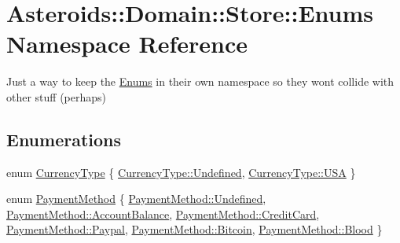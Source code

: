 \hypertarget{namespaceAsteroids_1_1Domain_1_1Store_1_1Enums}{}\section{Asteroids\+:\+:Domain\+:\+:Store\+:\+:Enums Namespace Reference}
\label{namespaceAsteroids_1_1Domain_1_1Store_1_1Enums}


Just a way to keep the \hyperlink{namespaceAsteroids_1_1Domain_1_1Store_1_1Enums}{Enums} in their own namespace so they won\textquotesingle{}t collide with other stuff (perhaps)  


\subsection*{Enumerations}
\begin{DoxyCompactItemize}
\item 
enum \hyperlink{namespaceAsteroids_1_1Domain_1_1Store_1_1Enums_a995d66dbd6bc566c0765fdcfd7be6006}{Currency\+Type} \{ \hyperlink{namespaceAsteroids_1_1Domain_1_1Store_1_1Enums_a995d66dbd6bc566c0765fdcfd7be6006aec0fc0100c4fc1ce4eea230c3dc10360}{Currency\+Type\+::\+Undefined}, 
\hyperlink{namespaceAsteroids_1_1Domain_1_1Store_1_1Enums_a995d66dbd6bc566c0765fdcfd7be6006af75d91cdd36b85cc4a8dfeca4f24fa14}{Currency\+Type\+::\+U\+SA}
 \}
\item 
enum \hyperlink{namespaceAsteroids_1_1Domain_1_1Store_1_1Enums_a0a0c269f6834cb8b1b6ed3bb02983564}{Payment\+Method} \{ \newline
\hyperlink{namespaceAsteroids_1_1Domain_1_1Store_1_1Enums_a0a0c269f6834cb8b1b6ed3bb02983564aec0fc0100c4fc1ce4eea230c3dc10360}{Payment\+Method\+::\+Undefined}, 
\hyperlink{namespaceAsteroids_1_1Domain_1_1Store_1_1Enums_a0a0c269f6834cb8b1b6ed3bb02983564acdb493713bd038a106af5159a9b813e8}{Payment\+Method\+::\+Account\+Balance}, 
\hyperlink{namespaceAsteroids_1_1Domain_1_1Store_1_1Enums_a0a0c269f6834cb8b1b6ed3bb02983564a38eb0c13548927ec00e0c21389f9fd3b}{Payment\+Method\+::\+Credit\+Card}, 
\hyperlink{namespaceAsteroids_1_1Domain_1_1Store_1_1Enums_a0a0c269f6834cb8b1b6ed3bb02983564a9b88c95a15e018c3f8038a7d0160145c}{Payment\+Method\+::\+Paypal}, 
\newline
\hyperlink{namespaceAsteroids_1_1Domain_1_1Store_1_1Enums_a0a0c269f6834cb8b1b6ed3bb02983564ad023ec040f79f1a9b2ac960b43785089}{Payment\+Method\+::\+Bitcoin}, 
\hyperlink{namespaceAsteroids_1_1Domain_1_1Store_1_1Enums_a0a0c269f6834cb8b1b6ed3bb02983564a747f992097b9e5c9df7585931537150a}{Payment\+Method\+::\+Blood}
 \}
\end{DoxyCompactItemize}


